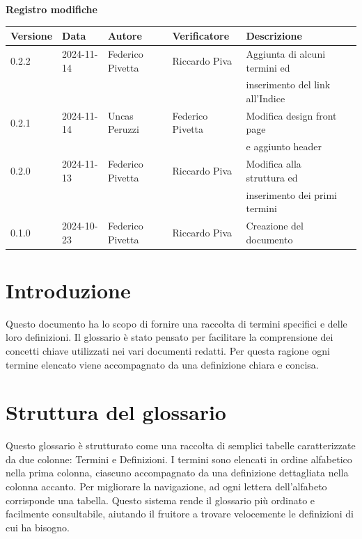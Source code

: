\documentclass[10pt]{article}
\begin{document}
\centering\textbf{Registro modifiche}\\
\vspace{2mm}
\begin{tabular}{|l|l|l|l|l|l|}
\hline
\textbf{Versione} & \textbf{Data} & \textbf{Autore} & \textbf{Verificatore} & \textbf{Descrizione}\\
\hline
0.2.2 & 2024-11-14  & Federico Pivetta & Riccardo Piva  & Aggiunta di alcuni termini ed\\ & & & & inserimento del link all'Indice\\
\hline
0.2.1 & 2024-11-14  & Uncas Peruzzi & Federico Pivetta  & Modifica design front page\\ & & & & e aggiunto header \\
\hline
0.2.0 & 2024-11-13  & Federico Pivetta & Riccardo Piva  & Modifica alla struttura ed\\
& & & & inserimento dei primi termini\\
\hline
0.1.0 & 2024-10-23  & Federico Pivetta & Riccardo Piva  & Creazione del documento\\
\hline

\end{tabular}

\newpage
\hypertarget{indice}{}
\raggedright
\tableofcontents
\newpage

\section{Introduzione}
Questo documento ha lo scopo di fornire una raccolta di termini specifici e delle loro definizioni. Il glossario è stato pensato per facilitare la comprensione dei concetti chiave utilizzati nei vari documenti redatti. Per questa ragione ogni termine elencato viene accompagnato da una definizione chiara e concisa.\\

\section{Struttura del glossario}
Questo glossario è strutturato come una raccolta di semplici tabelle caratterizzate da due colonne: Termini e Definizioni. I termini sono elencati in ordine alfabetico nella prima colonna, ciascuno accompagnato da una definizione dettagliata nella colonna accanto. \newline
Per migliorare la navigazione, ad ogni lettera dell'alfabeto corrisponde una tabella. Questo sistema rende il glossario più ordinato e facilmente consultabile, aiutando il fruitore a trovare velocemente le definizioni di cui ha bisogno.\\
\end{document}
